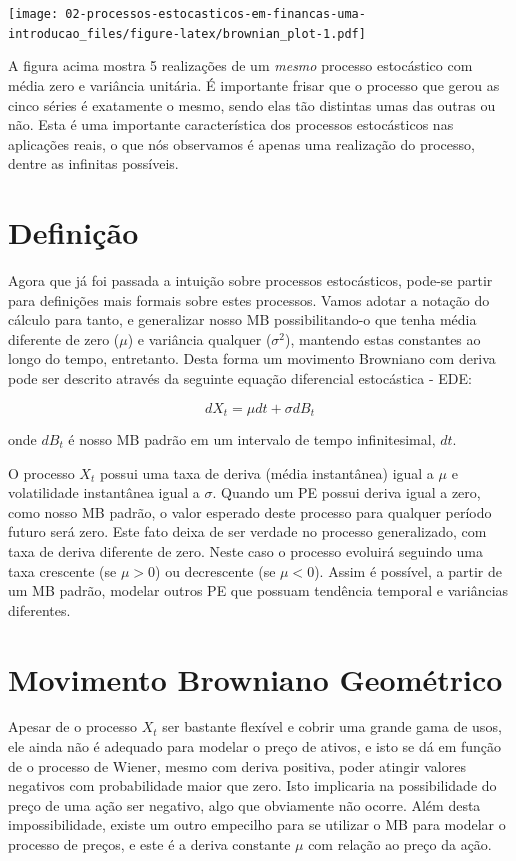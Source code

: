 \documentclass[]{book}
\begin{document}
\texttt{[image: 02-processos-estocasticos-em-financas-uma-introducao\_files/figure-latex/brownian\_plot-1.pdf]}

A figura acima mostra 5 realizações de um \emph{mesmo} processo
estocástico com média zero e variância unitária. É importante frisar que
o processo que gerou as cinco séries é exatamente o mesmo, sendo elas
tão distintas umas das outras ou não. Esta é uma importante
característica dos processos estocásticos nas aplicações reais, o que
nós observamos é apenas uma realização do processo, dentre as infinitas
possíveis.

\section{Definição}\label{definicao}

Agora que já foi passada a intuição sobre processos estocásticos,
pode-se partir para definições mais formais sobre estes processos. Vamos
adotar a notação do cálculo para tanto, e generalizar nosso MB
possibilitando-o que tenha média diferente de zero (\(\mu\)) e variância
qualquer (\(\sigma^2\)), mantendo estas constantes ao longo do tempo,
entretanto. Desta forma um movimento Browniano com deriva pode ser
descrito através da seguinte equação diferencial estocástica - EDE:

\begin{equation}
dX_t = \mu dt + \sigma dB_t
\label{eq:mb}
\end{equation}

onde \(dB_t\) é nosso MB padrão em um intervalo de tempo infinitesimal,
\(dt\).

O processo \(X_t\) possui uma taxa de deriva (média instantânea) igual a
\(\mu\) e volatilidade instantânea igual a \(\sigma\). Quando um PE
possui deriva igual a zero, como nosso MB padrão, o valor esperado deste
processo para qualquer período futuro será zero. Este fato deixa de ser
verdade no processo generalizado, com taxa de deriva diferente de zero.
Neste caso o processo evoluirá seguindo uma taxa crescente (se
\(\mu > 0\)) ou decrescente (se \(\mu < 0\)). Assim é possível, a partir
de um MB padrão, modelar outros PE que possuam tendência temporal e
variâncias diferentes.

\section{Movimento Browniano Geométrico}\label{mbg}

Apesar de o processo \(X_t\) ser bastante flexível e cobrir uma grande
gama de usos, ele ainda não é adequado para modelar o preço de ativos, e
isto se dá em função de o processo de Wiener, mesmo com deriva positiva,
poder atingir valores negativos com probabilidade maior que zero. Isto
implicaria na possibilidade do preço de uma ação ser negativo, algo que
obviamente não ocorre. Além desta impossibilidade, existe um outro
empecilho para se utilizar o MB para modelar o processo de preços, e
este é a deriva constante \(\mu\) com relação ao preço da ação.
\end{document}
